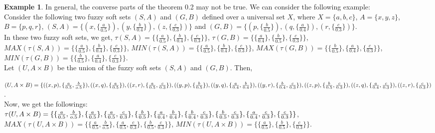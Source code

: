 \documentclass{article}
\theoremstyle{definition}
\newtheorem{example}{Example}[section]
\begin{document}
\begin{example}
    

In general, the converse parts of the theorem 0.2 may not be true. We can consider the following example:\\

Consider the following two fuzzy soft sets $(S, A)$ and $(G, B)$ defined over a universal set $X$, where $X=\{a, b, c\}$, $A=\{x, y, z\}$, $B=\{p, q, r\}$,
$(S,A)=\{(x, \{\frac{a}{0.5}\}), (y, \{\frac{b}{0.4}\}), (z, \{\frac{c}{0.3}\})\}$ and $(G,B)=\{(p, \{\frac{b}{0.5}\}), (q, \{\frac{a}{0.4}\}), (r, \{\frac{c}{0.3}\})\}$.\\

In these two fuzzy soft sets, we get,
$\tau(S, A)=\{\{\frac{a}{0.5}\}, \{\frac{b}{0.4}\}, \{\frac{c}{0.3}\}\}$, $\tau(G, B)=\{\{\frac{a}{0.4}\}, \{\frac{b}{0.5}\}, \{\frac{c}{0.3}\}\}$, $MAX(\tau(S, A))= \{\{\frac{a}{0.5}\}, \{\frac{b}{0.4}\}, \{\frac{c}{0.3}\} \}$, $MIN(\tau(S, A))= \{\{\frac{a}{0.5}\}, \{\frac{b}{0.4}\}, \{\frac{c}{0.3}\} \}$, $MAX(\tau(G, B))= \{ \{\frac{b}{0.5}\}, \{\frac{a}{0.4}\}, \{\frac{c}{0.3}\} \}$, $MIN(\tau(G, B))= \{ \{\frac{b}{0.5}\}, \{\frac{a}{0.4}\}, \{\frac{c}{0.3}\} \}$.\\


Let $(U, A\times B)$ be the union of the fuzzy soft sets $(S,A)$ and $(G,B)$. Then,

$(U, A\times B)=\{((x, p), \{\frac{a}{0.5}, \frac{b}{o.5}\}), ((x, q), \{ \frac{a}{0.5}\}), ((x, r), \{\frac{a}{0.5}, \frac{c}{0.3}\}), ((y, p),\\ \{\frac{b}{0.5}\}), ((y, q), \{\frac{a}{0.4}, \frac{b}{0.4}\}), ((y, r), \{\frac{b}{0.4}, \frac{c}{0.3}\}), ((z, p), \{\frac{b}{0.5}, \frac{c}{0.3}\}), ((z, q), \{\frac{a}{0.4}, \frac{c}{0.3}\}), \\ ((z, r), \{\frac{c}{0.3}\}) $.\\

Now, we get the followings: \\

$\tau(U,A\times B)=\{\{\frac{a}{0.5}, \frac{b}{o.5}\}, \{ \frac{a}{0.5}\}, \{\frac{a}{0.5}, \frac{c}{0.3}\}, \{\frac{b}{0.5}\}, \{\frac{a}{0.4}, \frac{b}{0.4}\}, \{\frac{b}{0.4}, \frac{c}{0.3}\}, \{\frac{b}{0.5},\\ \frac{c}{0.3}\}, \{\frac{a}{0.4}, \frac{c}{0.3}\}, \{\frac{c}{0.3}\}\}$, $MAX(\tau(U,A\times B))=\{\{\frac{a}{0.5}, \frac{b}{o.5}\}, \{\frac{a}{0.5}, \frac{c}{0.3}\}, \{\frac{b}{0.5}, \frac{c}{0.3}\}\}$, $MIN(\tau(U,A\times B))=\{ \{\frac{a}{0.5}\}, \{\frac{b}{0.5}\}, \{\frac{c}{0.3}\} \}$.\\


\end{example}
\end{document}

